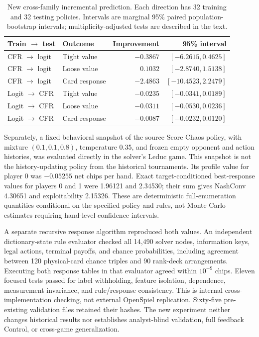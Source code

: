 \documentclass[journal]{IEEEtran}
\begin{document}
\begin{table}[t]
\caption{New cross-family incremental prediction. Each direction has 32 training and 32 testing policies. Intervals are marginal 95\% paired population-bootstrap intervals; multiplicity-adjusted tests are described in the text.}
\label{tab:prospective-transfer}
\centering\scriptsize
\setlength{\tabcolsep}{3pt}
\begin{tabular}{llrr}
\toprule
Train $\to$ test & Outcome & Improvement & 95\% interval \\
\midrule
CFR $\to$ logit & Tight value & $-0.3867$ & $[-6.2615,0.4625]$ \\
CFR $\to$ logit & Loose value & $0.1032$ & $[-2.8740,1.5138]$ \\
CFR $\to$ logit & Card response & $-2.4863$ & $[-10.4523,2.2479]$ \\
Logit $\to$ CFR & Tight value & $-0.0235$ & $[-0.0341,0.0189]$ \\
Logit $\to$ CFR & Loose value & $-0.0311$ & $[-0.0530,0.0236]$ \\
Logit $\to$ CFR & Card response & $-0.0087$ & $[-0.0232,0.0120]$ \\
\bottomrule
\end{tabular}
\end{table}

Separately, a fixed behavioral snapshot of the source Score Chaos policy, with mixture $(0.1,0.1,0.8)$, temperature 0.35, and frozen empty opponent and action histories, was evaluated directly in the solver's Leduc game. This snapshot is not the history-updating policy from the historical tournaments. Its profile value for player 0 was $-0.05255$ net chips per hand. Exact target-conditioned best-response values for players 0 and 1 were 1.96121 and 2.34530; their sum gives NashConv 4.30651 and exploitability 2.15326. These are deterministic full-enumeration quantities conditional on the specified policy and rules, not Monte Carlo estimates requiring hand-level confidence intervals.

A separate recursive response algorithm reproduced both values. An independent dictionary-state rule evaluator checked all 14,490 solver nodes, information keys, legal actions, terminal payoffs, and chance probabilities, including agreement between 120 physical-card chance triples and 90 rank-deck arrangements. Executing both response tables in that evaluator agreed within $10^{-9}$ chips. Eleven focused tests passed for label withholding, feature isolation, dependence, measurement invariance, and rule/response consistency. This is internal cross-implementation checking, not external OpenSpiel replication. Sixty-five pre-existing validation files retained their hashes. The new experiment neither changes historical results nor establishes analyst-blind validation, full feedback Control, or cross-game generalization.
\end{document}
